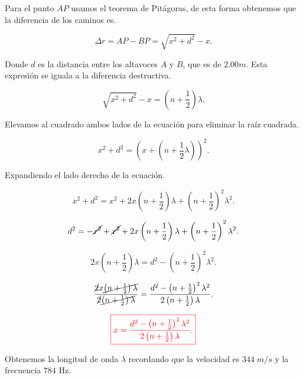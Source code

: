 \documentclass[a4paper,12pt]{article} %
\begin{document}
\begin{justify}
    Para el punto \(AP\) usamos el teorema de Pitágoras, de esta forma obtenemos que la diferencia de los caminos es.
\end{justify}

\[ \Delta r = AP - BP = \sqrt{x^2 + d^2} - x.\]

\begin{justify}
    Donde \(d\) es la distancia entre los altavoces \(A\) y \(B\), que es de \(2.00 m\). Esta expresión se iguala a la diferencia destructiva.
\end{justify}

\[ \sqrt{x^2 + d^2} -x = \left(n + \frac{1}{2}\right) \lambda.\]

\begin{justify}
    Elevamos al cuadrado ambos lados de la ecuación para eliminar la raíz cuadrada.
\end{justify}

\[ x^2 + d^2 = \left(x + \left(n + \frac{1}{2} \lambda\right)\right)^2.\]

\begin{justify}
    Expandiendo el lado derecho de la ecuación.
\end{justify}

\[ x^2 + d^2 = x^2 + 2x\left(n + \frac{1}{2}\right)\lambda + \left(n + \frac{1}{2}\right)^2 \lambda^2.\]

\[ d^2 = -\cancel{x^2} + \cancel{x^2} + 2x\left(n + \frac{1}{2}\right)\lambda + \left(n + \frac{1}{2}\right)^2 \lambda^2.\]

\[ 2x \left(n + \frac{1}{2}\right)\lambda = d^2 - \left(n + \frac{1}{2}\right)^2 \lambda^2. \]

\vspace{\baselineskip}

\[ \frac{\cancel{2}x \cancel{\left(n + \frac{1}{2}\right)\lambda}}{\cancel{2}\cancel{\left(n + \frac{1}{2}\right)\lambda}} = \frac{d^2 - \left(n + \frac{1}{2}\right)^2 \lambda^2 }{ 2\left(n + \frac{1}{2}\right)\lambda}.  \]

\vspace{\baselineskip}

\[ \textcolor{red}{\boxed{x = \frac{d^2 - \left(n + \frac{1}{2} \right)^2 \lambda^2}{2 \left(n + \frac{1}{2}\right) \lambda}.}}\]

\begin{justify}
    Obtenemos la longitud de onda \(\lambda\) recordando que la velocidad es \(344 \; m/s\) y la frecuencia \(784\) Hz.
\end{justify}
\end{document}

